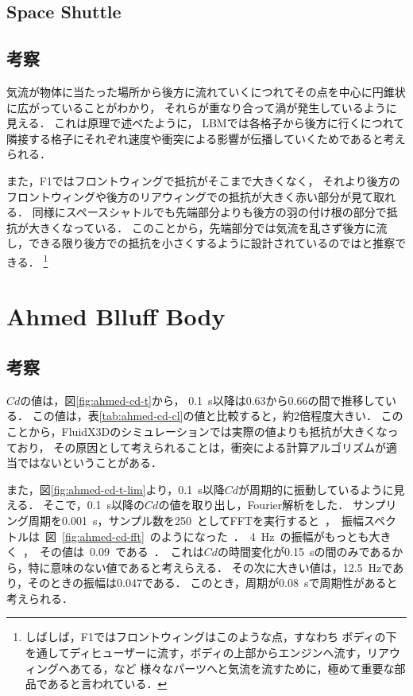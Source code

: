 \documentclass[main]{subfiles}
\begin{document}
\subsection{Space Shuttle}


\subsection{考察}
気流が物体に当たった場所から後方に流れていくにつれてその点を中心に円錐状に広がっていることがわかり，
それらが重なり合って渦が発生しているように見える．
これは原理で述べたように，
LBMでは各格子から後方に行くにつれて隣接する格子にそれぞれ速度や衝突による影響が伝播していくためであると考えられる．

また，F1ではフロントウィングで抵抗がそこまで大きくなく，
それより後方のフロントウィングや後方のリアウィングでの抵抗が大きく赤い部分が見て取れる．
同様にスペースシャトルでも先端部分よりも後方の羽の付け根の部分で抵抗が大きくなっている．
このことから，先端部分では気流を乱さず後方に流し，できる限り後方での抵抗を小さくするように設計されているのではと推察できる．
\footnote{
    しばしば，F1ではフロントウィングはこのような点，すなわち
    ボディの下を通してディヒューザーに流す，ボディの上部からエンジンへ流す，リアウィングへあてる，など
    様々なパーツへと気流を流すために，極めて重要な部品であると言われている．
}

\clearpage

\section{Ahmed Blluff Body}

\subsection{考察}
$Cd$の値は，図\ref{fig:ahmed-cd-t}から，
\SI{0.1}{\second}以降は\SI{0.63}{}から\SI{0.66}{}の間で推移している．
この値は，表\ref{tab:ahmed-cd-cl}の値と比較すると，約\SI{2}{}倍程度大きい．
このことから，FluidX3Dのシミュレーションでは実際の値よりも抵抗が大きくなっており，
その原因として考えられることは，衝突による計算アルゴリズムが適当ではないということがある．

また，図\ref{fig:ahmed-cd-t-lim}より，\SI{0.1}{\second}以降$Cd$が周期的に振動しているように見える．
そこで，\SI{0.1}{\second}以降の$Cd$の値を取り出し，Fourier解析をした．
サンプリング周期を\SI{0.001}{\second}，サンプル数を\SI{250}としてFFTを実行すると，振幅スペクトルは
図\ref{fig:ahmed-cd-fft}のようになった．
\SI{4}{\Hz}の振幅がもっとも大きく，その値は\SI{0.09}{}である．
これは$Cd$の時間変化が\SI{0.15}{\second}の間のみであるから，特に意味のない値であると考えらえる．
その次に大きい値は，\SI{12.5}{\Hz}であり，そのときの振幅は\SI{0.047}{}である．
このとき，周期が\SI{0.08}{\second}で周期性があると考えられる．
\end{document}
